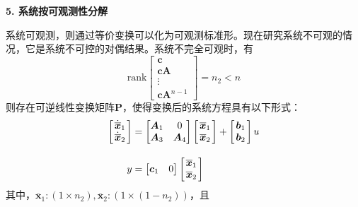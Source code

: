 \noindent \textbf{5. 系统按可观测性分解}

系统可观测，则通过等价变换可以化为可观测标准形。现在研究系统不可观的情况，它是系统不可控的对偶结果。系统不完全可观时，有
\begin{equation}
	\text{rank}
	\begin{bmatrix}
		\bm{c} \\ 
		\bm{cA}\\
		\vdots \\
		\bm{c} \bm{A}^{n-1}
	\end{bmatrix}
	= n_2 < n
	\label{不可观}
\end{equation}
则存在可逆线性变换矩阵$\bm{P}$，使得变换后的系统方程具有以下形式：
\begin{align}
	\begin{bmatrix}
		\hspace*{0.5mm}\dot{\overline{\bm{x}}}_1 \hspace*{0.5mm}\\
		\dot{\overline{\bm{x}}}_2 \\
	\end{bmatrix}
	&=
	\begin{bmatrix}
		\bm{A}_1 & 0\\
		\bm{A}_3 & \bm{A}_4
	\end{bmatrix}
	\begin{bmatrix}
		\hspace*{0.5mm}\overline{\bm{x}}_1 \hspace*{0.5mm}\\
		\overline{\bm{x}}_2 \\
	\end{bmatrix}
	+
	\begin{bmatrix}
		\hspace*{0.5mm}	\bm{b}_1 \hspace*{0.5mm}\\
		\bm{b}_2
	\end{bmatrix}u \\[1em]
	y &= 
	\begin{bmatrix}
		\bm{c}_1 & 0
	\end{bmatrix}
	\begin{bmatrix}
		\hspace*{0.5mm}\overline{\bm{x}}_1 \hspace*{0.5mm}\\
		\overline{\bm{x}}_2 \\
	\end{bmatrix}
\end{align}
其中，$\overline{\bm{x}}_1:(1 \times n_2),\overline{\bm{x}}_2:(1 \times (1 - n_2))$，且

